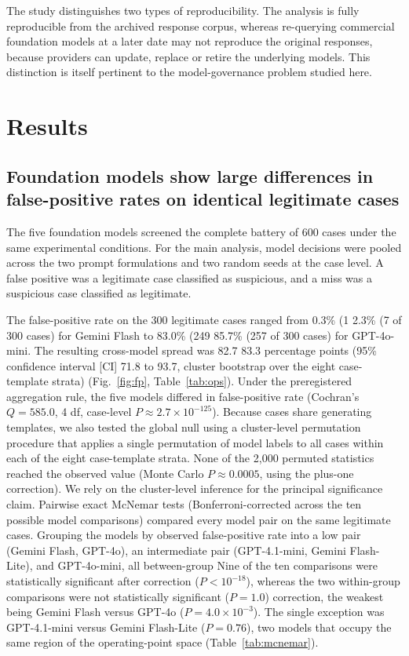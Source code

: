 \documentclass[pdflatex,sn-basic,Numbered]{sn-jnl}
\newcommand{\HLtext}[1]{\texthl{#1}}
\newcommand{\HLdel}[1]{\textcolor{HLink}{\sout{#1}}}
\renewcommand{\HLtext}[1]{#1}\renewcommand{\HLdel}[1]{#1}%
\begin{document}
The study distinguishes two types of reproducibility. The analysis is fully reproducible from the archived response corpus, whereas re-querying commercial foundation models at a later date may not reproduce the original responses, because providers can update, replace or retire the underlying models. This distinction is itself pertinent to the model-governance problem studied here.

\section{Results}\label{sec:results}

\subsection{Foundation models show large differences in false-positive rates on identical legitimate cases}\label{sec:fpspread}

The five foundation models screened the complete battery of 600 cases under the same experimental conditions. For the main analysis, model decisions were pooled across the two prompt formulations and two random seeds at the case level. A false positive was a legitimate case classified as suspicious, and a miss was a suspicious case classified as legitimate.

The false-positive rate on the 300 legitimate cases ranged from \HLdel{0.3\% (1} \HLtext{2.3}\% \HLtext{(7} of 300 cases) for Gemini Flash to \HLdel{83.0\% (249} \HLtext{85.7}\% \HLtext{(257} of 300 cases) for GPT-4o-mini. The resulting cross-model spread was \HLdel{82.7} \HLtext{83.3} percentage points (95\% confidence interval [CI] \HLtext{71.8 to 93.7, cluster bootstrap over the eight case-template strata)} (Fig.~\ref{fig:fp}\HLtext{,} Table~\ref{tab:ops}\HLtext{). Under the preregistered aggregation rule, the five models differed in false-positive rate (Cochran's} $Q = 585.0$\HLtext{, 4 df, case-level} $P \approx 2.7\times10^{-125}$\HLtext{). Because cases share generating templates, we also tested the global null using a cluster-level permutation procedure that applies a single permutation of model labels to all cases within each of the eight case-template strata. None of the 2,000 permuted statistics reached the observed value (Monte Carlo} $P \approx 0.0005$\HLtext{, using the plus-one correction). We rely on the cluster-level inference for the principal significance claim.} Pairwise exact McNemar tests (Bonferroni-corrected across the ten possible model comparisons) compared every model pair on the same legitimate cases. \HLdel{Grouping the models by observed false-positive rate into a low pair (Gemini Flash, GPT-4o), an intermediate pair (GPT-4.1-mini, Gemini Flash-Lite), and GPT-4o-mini, all between-group} \HLtext{Nine of the ten} comparisons were statistically significant after \HLdel{correction ($P < 10^{-18}$), whereas the two within-group comparisons were not statistically significant ($P = 1.0$)} \HLtext{correction, the weakest being Gemini Flash versus GPT-4o (}$P = 4.0\times10^{-3}$\HLtext{). The single exception was GPT-4.1-mini versus Gemini Flash-Lite (}$P = 0.76$\HLtext{), two models that occupy the same region of the operating-point space} (Table~\ref{tab:mcnemar}).
\end{document}
